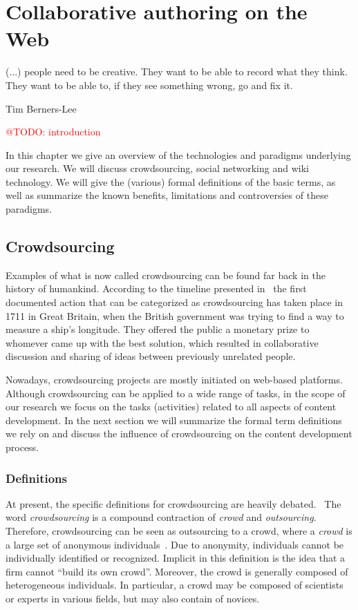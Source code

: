 \documentclass[ngerman,UKenglish,table]{scrbook}
\makeatletter
\newcommand{\todo}[1]{\textcolor{red}{@TODO: #1}}
\makeatother
\begin{document}
\chapter{Collaborative authoring on the Web}

\epigraph{(...) people need to be creative. They want to be able to record what they think. They want to be able to, if they see something wrong, go and fix it.}{Tim Berners-Lee}


\todo{introduction}

In this chapter we give an overview of the technologies and paradigms underlying our research.
We will discuss crowdsourcing, social networking and wiki technology.
We will give the (various) formal definitions of the basic terms, as well as summarize the known benefits, limitations and controversies of these paradigms.

\section{Crowdsourcing}
Examples of what is now called crowdsourcing can be found far back in the history of humankind.
According to the timeline presented in~\cite{dawson2012getting} the first documented action that can be categorized as crowdsourcing has taken place in 1711 in Great Britain, when the British government was trying to find a way to measure a ship’s longitude.
They offered the public a monetary prize to whomever came up with the best solution, which resulted in collaborative discussion and sharing of ideas between previously unrelated people.

Nowadays, crowdsourcing projects are mostly initiated on web-based platforms.
Although crowdsourcing can be applied to a wide range of tasks, in the scope of our research we focus on the tasks (activities) related to all aspects of content development.
In the next section we will summarize the formal term definitions we rely on and discuss the influence of crowdsourcing on the content development process.


\subsection{Definitions}
\label{sec:crowdsourcing_def}
At present, the specific definitions for crowdsourcing are heavily debated.~\cite{estelles2012towards}
The word \emph{crowdsourcing} is a compound contraction of \emph{crowd} and \emph{outsourcing}.
Therefore, crowdsourcing can be seen as outsourcing to a crowd, where a \emph{crowd} is a large set of anonymous individuals~\cite{surowiecki2005wisdom}.
Due to anonymity, individuals cannot be individually identified or recognized. 
Implicit in this definition is the idea that a firm cannot “build its own crowd”. 
Moreover, the crowd is generally composed of heterogeneous individuals.
In particular, a crowd may be composed of scientists or experts in various fields, but may also contain of novices.
\end{document}

